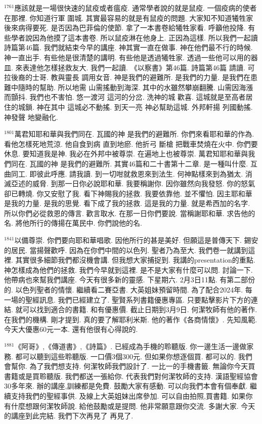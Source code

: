 \documentclass{book}
\begin{document}
$^{1761}$應該就是一場很快速的鼠疫或者瘟疫.
通常學者說的就是鼠疫.
一個疫病的使者在那裡.
你知道行軍 圍城.
其實最容易的就是有鼠疫的問題.
大家知不知道犧牲家後來病得要死.
是否因為巴菲倫的使節.
拿了一本書卷給犧牲家看.
呼籲他投降.
有些學者說因為他摸了這本書卷.
所以鼠疫淋在他身上.
正因為這樣.
所以我們一起讀詩篇第46篇.
我們就結束今早的講座.
神其實一直在做事.
神在他們最不行的時候.
神一直出手.
有些他是很清楚的講明.
有些他是透過犧牲家.
透過一些他可以用的器皿.
來表達他怎樣拯救友大.
我們一起讀.
《以察書》第46篇.
詩篇第46篇 請讀.
可拉後裔的士哥.
教與靈長 調用女音.
神是我們的避難所.
是我們的力量.
是我們在患難中隨時的幫助.
所以地需 山需搖動到海深.
其中的水雖然攀崩翻騰.
山需因海漲而顫抖.
我們也不害怕.
悠一渡河 這河的分岔.
洗神的城 歡喜.
這城就是至高者居住的城鎖.
神在其中 這城必不動搖.
到天一亮 神必幫助這城.
外邦軒揚 列國動搖.
神發聲 地變融化.

$^{1801}$萬君知耶和華與我們同在.
瓦國的神 是我們的避難所.
你們來看耶和華的作為.
看他怎樣死地荒涼.
他自食到病 直到地瘀.
他折弓 斷槍 把戰車焚燒在火中.
你們要休息.
要知道我是神.
我必在外邦中被尊崇.
在遍地上也被尊崇.
萬君知耶和華與我們同在.
瓦國的神 是我們的避難所.
其實46篇和二十書第十二章.
是一種叫什麼.
互曲同工.
即彼此呼應.
請我讀.
到一切咁就救恩來到法生.
何神點樣來到為猶太.
消滅亞述的威脅.
到那一日你必說耶和華.
我要稱謝你.
因你雖然向我發怒.
你的怒氣卻已轉燒.
你又安慰了我.
看下神賜我的拯救.
我要依靠他.
並不懼怕.
因主耶和華是我的力量.
是我的思覺.
看下成了我的拯救.
這是我的力量.
就是希西加的名字.
所以你們必從救恩的傳言.
歡言取水.
在那一日你們要說.
當稱謝耶和華.
求告他的名.
將他所行的傳揚在萬民中.
你們說他的名.

$^{1841}$以備尊崇.
你們要向耶和華唱歌.
因他所行的甚是美好.
但願這是普傳天下.
錫安的居民.
當揚聲歡呼.
因為在你們中間的以色列.
聖者乃為至大.
我們卷一就講到這裡.
其實很多細節我們都沒機會講.
但我想大家捕捉到.
我講的presentation的重點.
神怎樣成為他們的拯救.
我們今早就到這裡.
是不是大家有什麼可以問.
討論一下.
他帶病也來幫我們講座.
今天有很多新的靈感.
下星期六.
2月3日11點.
有第二部份的.
以色列聖者的情懷.
繼續看二賽亞書.
大英姐妹預留時間.
為了配合2024年.
每一場的聖經訊息.
我們已經建立了.
聖賢系列書籍優惠專區.
只要點擊影片下方的連結.
就可以找到適合的書籍.
和有優惠價.
截止日期到3月9日.
何潔牧師有他的著作.
在我們的機構.
剛才提到.
真的要了解耶利米斯.
他的著作《各商情懷》.
先知風範.
今天大優惠60元一本.
還有他很有心得說的.

$^{1881}$《阿哥》,《傳道書》,《詩篇》.
已經成為手機的聆聽版.
你一邊生活一邊做家務.
都可以聽到這些聆聽版.
一口價3個300元.
但如果你想逐個買.
都可以的.
我們會幫你.
為了我們想支持.
何潔牧師我們設計了.
一比一的手機書籤.
無論你今天買書籍或是買聆聽版.
我們都送一張給你.
代表我們對何潔牧師的支持.
漢語聖經協會30多年來.
辦的講座,訓練都是免費.
鼓勵大家有感動.
可以向我們本會有個奉獻.
繼續支持我們的聖經事供.
及線上大英姐妹出席參加.
可以自由拍照,買書籍.
如果你有什麼想跟何潔牧師說.
給他鼓勵或是提問.
他非常願意跟你交流.
多謝大家.
今天的講座到此完結.
我們下次再見了 再見了.
\newpage
\end{document}
